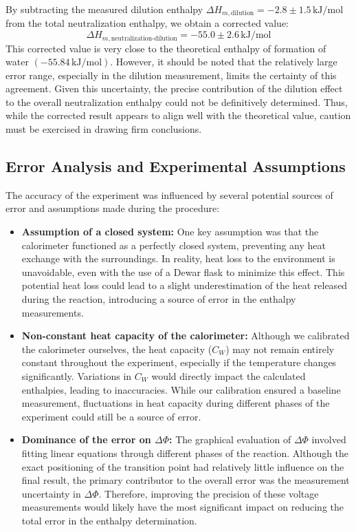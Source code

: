 \documentclass[a4paper,12pt]{article}
\begin{document}
By subtracting the measured dilution enthalpy \(\Delta H_{m, \text{dilution}} = -2.8 \pm 1.5 \, \si{\kilo\joule\per\mol}\) from the total neutralization enthalpy, we obtain a corrected value:
\[
\Delta H_{m, \text{neutralization-dilution}} = -55.0 \pm 2.6 \, \si{\kilo\joule\per\mol}
\]
This corrected value is very close to the theoretical enthalpy of formation of water \((-55.84 \, \si{\kilo\joule\per\mol})\). However, it should be noted that the relatively large error range, especially in the dilution measurement, limits the certainty of this agreement. Given this uncertainty, the precise contribution of the dilution effect to the overall neutralization enthalpy could not be definitively determined. Thus, while the corrected result appears to align well with the theoretical value, caution must be exercised in drawing firm conclusions.

\subsection{Error Analysis and Experimental Assumptions}
The accuracy of the experiment was influenced by several potential sources of error and assumptions made during the procedure:

\begin{itemize}
    \item \textbf{Assumption of a closed system:} One key assumption was that the calorimeter functioned as a perfectly closed system, preventing any heat exchange with the surroundings. In reality, heat loss to the environment is unavoidable, even with the use of a Dewar flask to minimize this effect. This potential heat loss could lead to a slight underestimation of the heat released during the reaction, introducing a source of error in the enthalpy measurements.

    \item \textbf{Non-constant heat capacity of the calorimeter:} Although we calibrated the calorimeter ourselves, the heat capacity (\(C_W\)) may not remain entirely constant throughout the experiment, especially if the temperature changes significantly. Variations in \(C_W\) would directly impact the calculated enthalpies, leading to inaccuracies. While our calibration ensured a baseline measurement, fluctuations in heat capacity during different phases of the experiment could still be a source of error.

    \item \textbf{Dominance of the error on \(\Delta \Phi\):} The graphical evaluation of \(\Delta \Phi\) involved fitting linear equations through different phases of the reaction. Although the exact positioning of the transition point had relatively little influence on the final result, the primary contributor to the overall error was the measurement uncertainty in \(\Delta \Phi\). Therefore, improving the precision of these voltage measurements would likely have the most significant impact on reducing the total error in the enthalpy determination.
\end{itemize}
\end{document}
